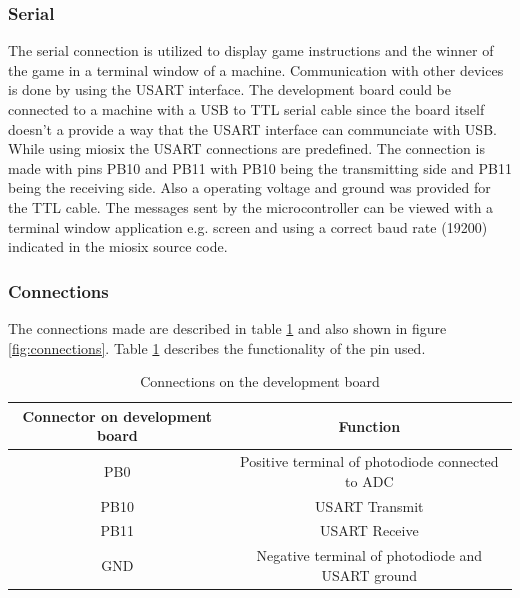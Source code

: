 \subsubsection{Serial}
The serial connection is utilized to display game instructions and the winner of the game in a terminal window of a machine. Communication with other devices is done by using the USART interface. The development board could be connected to a machine with a USB to TTL serial cable since the board itself doesn't a provide a way that the USART interface can communciate with USB. While using miosix the USART connections are predefined. The connection is made with pins PB10 and PB11 with PB10 being the transmitting side and PB11 being the receiving side. Also a operating voltage and ground was provided for the TTL cable. The messages sent by the microcontroller can be viewed with a terminal window application e.g. screen and using a correct baud rate (19200) indicated in the miosix source code.



\subsubsection{Connections}
The connections made are described in table \ref{table:1} and also shown in figure \ref{fig:connections}. Table \ref{table:1} describes the functionality of the pin used.

\begin{table}
\caption{Connections on the development board}
\label{table:1}
\begin{center}
\begin{tabular}{ |c|c| } 
 \hline
 Connector on development board & Function\\ 
 \hline
 PB0 & Positive terminal of photodiode connected to ADC \\
 PB10 & USART Transmit \\
 PB11 & USART Receive \\
 GND & Negative terminal of photodiode and USART ground \\
 \hline
\end{tabular}
\end{center}
\end{table}


